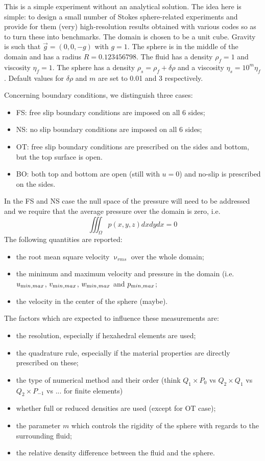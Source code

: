 
This is a simple experiment without an analytical solution. The idea here is simple: to design
a small number of Stokes sphere-related experiments and provide for them (very) high-resolution results 
obtained with various codes so as to turn these into benchmarks. 
The domain is chosen to be a unit cube. Gravity is such that $\vec{g}=(0,0,-g)$ with $g=1$. 
The sphere is in the middle of the domain and has a radius $R=0.123456798$.
The fluid has a density $\rho_f=1$ and viscosity $\eta_f=1$. The sphere has a density $\rho_s=\rho_f+\delta\rho$
and a viscosity $\eta_s=10^m \eta_f$. Default values for $\delta\rho$ and $m$ are set to 0.01 and 3 respectively.

Concerning boundary conditions, we distinguish three cases:
\begin{itemize}
\item FS: free slip boundary conditions are imposed on all 6 sides;
\item NS: no slip boundary conditions are imposed on all 6 sides;
\item OT: free slip boundary conditions are prescribed on the sides and bottom, but the top surface is open.
\item BO: both top and bottom are open (still with $u=0$) and no-slip is prescribed on the sides.
\end{itemize}

In the FS and NS case the null space of the pressure will need to be addressed and we require that the average 
pressure over the domain is zero, i.e.
\[
\iiint_\Omega p(x,y,z) dxdydx = 0
\]
The following quantities are reported:
\begin{itemize}
\item the root mean square velocity $\upnu_{rms}$ over the whole domain;
\item the minimum and maximum velocity and pressure in the domain (i.e. $u_{\text min,max}$, $v_{\text min,max}$,
      $w_{\text min,max}$ and $p_{\text min,max}$;
\item the velocity in the center of the sphere (maybe).
\end{itemize}

\noindent The factors which are expected to influence these measurements are:
\begin{itemize}
\item the resolution, especially if hexahedral elements are used;
\item the quadrature rule, especially if the material properties are directly prescribed on these;
\item the type of numerical method and their order (think $Q_1\times P_0$ vs $Q_2\times Q_1$ vs $Q_2 \times P_{-1}$
      vs ... for finite elements)
\item whether full or reduced densities are used (except for OT case);
\item the parameter $m$ which controls the rigidity of the sphere with regards to the surrounding fluid;
\item the relative density difference between the fluid and the sphere.
\end{itemize}

